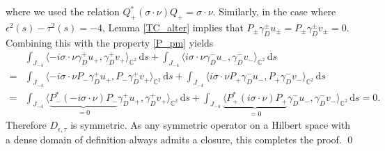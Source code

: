 \documentclass[11pt,a4paper,reqno,oneside]{amsproc}
\numberwithin{equation}{section}
\begin{document}
 where we used the relation  $Q_+^\ast(\sigma\cdot\nu)Q_+ =\sigma\cdot\nu$. Similarly, in the case where $\epsilon^2(s)-\tau^2(s)=-4$, Lemma \ref{TC_alter} implies that $P_\pm\gamma_D^\pm u_\pm=P_\pm\gamma_D^\pm v_\pm=0$. Combining this with the property \eqref{P_pm} yields
 \begin{align*}
&\int_{J_{-4}} \langle- i\sigma\cdot\nu\gamma_D^+ u_+,{ \gamma_D^+ v_+} \rangle_{\mathbb C^2}\,\mathrm{d}s+\int_{J_{-4}}  \langle i\sigma\cdot\nu\gamma_D^- u_-,{ \gamma_D^- v_-} \rangle_{\mathbb C^2}\,\mathrm{d}s\\ 
=&\int_{J_{-4}} \langle- i\sigma\cdot\nu P_-\gamma_D^+ u_+,P_-{ \gamma_D^+ v_+} \rangle_{\mathbb C^2}\,\mathrm{d}s+\int_{J_{-4}}  \langle i\sigma\cdot\nu P_+\gamma_D^- u_-,P_+{ \gamma_D^- v_-} \rangle_{\mathbb C^2}\,\mathrm{d}s\\
=&\int_{J_{-4}} \langle \underbrace{P_-^\ast(- i\sigma\cdot\nu) P_-}_{=0}\gamma_D^+ u_+, \gamma_D^+ v_+ \rangle_{\mathbb C^2}\,\mathrm{d}s+\int_{J_{-4}}  \underbrace{\langle P_+^\ast( i\sigma\cdot\nu) P_+}_{=0}\gamma_D^- u_-, \gamma_D^- v_- \rangle_{\mathbb C^2}\,\mathrm{d}s=0.
\end{align*} 
Therefore $D_{\epsilon,\tau}$ is symmetric. As any symmetric operator on a Hilbert space with a dense domain of definition always admits
a closure, this completes the proof.
\qed
\end{document}
